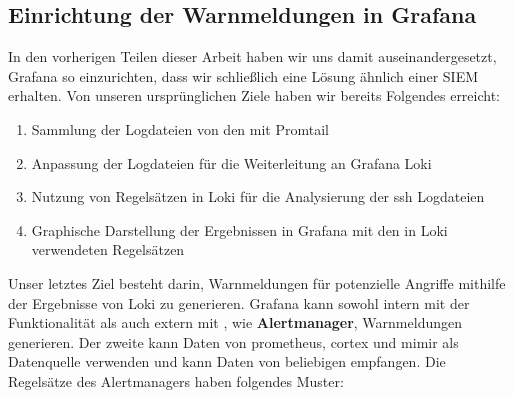 
\subsection{Einrichtung der Warnmeldungen in Grafana}
In den vorherigen Teilen dieser Arbeit haben wir uns damit auseinandergesetzt, Grafana so einzurichten, dass wir schließlich eine Lösung ähnlich einer \gls{SIEM} erhalten. Von unseren ursprünglichen Ziele haben wir bereits Folgendes erreicht:

{
\begin{enumerate}[noitemsep]
   \item	Sammlung der Logdateien von den  mit Promtail
   \item Anpassung der Logdateien für die Weiterleitung an Grafana Loki
   \item Nutzung von Regelsätzen in Loki für die Analysierung der \gls{ssh} Logdateien
   \item Graphische Darstellung der Ergebnissen in Grafana mit den in Loki verwendeten Regelsätzen
\end{enumerate}
}

Unser letztes Ziel besteht darin, Warnmeldungen für potenzielle Angriffe mithilfe der Ergebnisse von Loki zu generieren. Grafana kann sowohl intern mit der Funktionalität  als auch extern mit , wie \textbf{Alertmanager}, Warnmeldungen generieren. Der zweite kann Daten von \gls{prometheus}, \gls{cortex} und \gls{mimir} als Datenquelle verwenden \citep{Grafana_Alertmanager} und kann Daten von beliebigen  empfangen. Die Regelsätze des Alertmanagers haben folgendes Muster:

